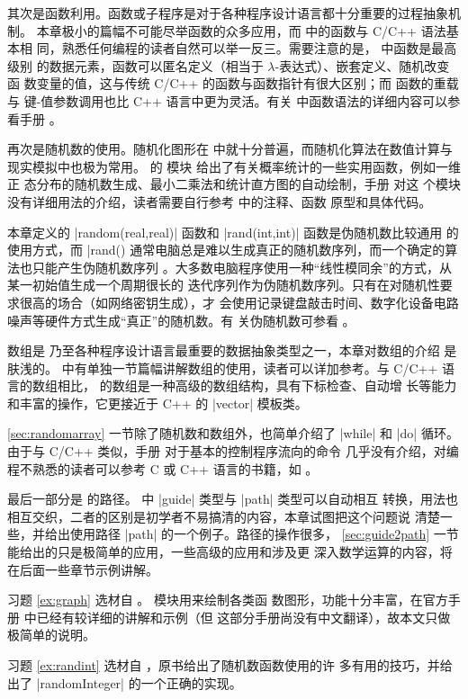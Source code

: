 其次是函数利用。函数或子程序是对于各种程序设计语言都十分重要的过程抽象机制。
本章极小的篇幅不可能尽举函数的众多应用，而 \Asy{} 中的函数与 C/C++ 语法基本相
同，熟悉任何编程的读者自然可以举一反三。需要注意的是，\Asy{} 中函数是最高级别
的数据元素，函数可以匿名定义（相当于 $\lambda$-表达式）、嵌套定义、随机改变函
数变量的值，这与传统 C/C++ 的函数与函数指针有很大区别；而 \Asy{} 函数的重载与
键-值参数调用也比 C++ 语言中更为灵活。有关 \Asy{} 中函数语法的详细内容可以参
看手册 \cite{asyman}。

再次是随机数的使用。随机化图形在 \MP{} 中就十分普遍，而随机化算法在数值计算与
现实模拟中也极为常用。\Asy{} 的  模块
 给出了有关概率统计的一些实用函数，例如一维正
态分布的随机数生成、最小二乘法和统计直方图的自动绘制，手册 \cite{asyman} 对这
个模块没有详细用法的介绍，读者需要自行参考  中的注释、函数
原型和具体代码。

本章定义的 |random(real,real)| 函数和 |rand(int,int)| 函数是伪随机数比较通用
的使用方式，而 |rand() %
通常电脑总是难以生成真正的随机数序列，而一个确定的算法也只能产生伪随机数序列
。大多数电脑程序使用一种“线性模同余”的方式，从某一初始值生成一个周期很长的
迭代序列作为伪随机数序列。只有在对随机性要求很高的场合（如网络密钥生成），才
会使用记录键盘敲击时间、数字化设备电路噪声等硬件方式生成“真正”的随机数。有
关伪随机数可参看 \cite{taocp2}。

数组是 \Asy{} 乃至各种程序设计语言最重要的数据抽象类型之一，本章对数组的介绍
是肤浅的。\cite{asyman} 中有单独一节篇幅讲解数组的使用，读者可以详加参考。与
C/C++ 语言的数组相比，\Asy{} 的数组是一种高级的数组结构，具有下标检查、自动增
长等能力和丰富的操作，它更接近于 C++ 的 |vector| 模板类。

\autoref{sec:randomarray} 一节除了随机数和数组外，也简单介绍了 |while| 和
|do| 循环。由于与 C/C++ 类似，手册 \cite{asyman} 对于基本的控制程序流向的命令
几乎没有介绍，对编程不熟悉的读者可以参考 C 或 C++ 语言的书籍，如 \cite{kandr}
。

最后一部分是 \Asy{} 的路径。\Asy{} 中 |guide| 类型与 |path| 类型可以自动相互
转换，用法也相互交织，二者的区别是初学者不易搞清的内容，本章试图把这个问题说
清楚一些，并给出使用路径 |path| 的一个例子。路径的操作很多，
\autoref{sec:guide2path} 一节能给出的只是极简单的应用，一些高级的应用和涉及更
深入数学运算的内容，将在后面一些章节示例讲解。

习题 \ref{ex:graph} 选材自 \cite{pgfman}。 模块用来绘制各类函
数图形，功能十分丰富，在官方手册 \cite{asyman} 中已经有较详细的讲解和示例（但
这部分手册尚没有中文翻译），故本文只做极简单的说明。

习题 \ref{ex:randint} 选材自 \cite{roberts1995}，原书给出了随机数函数使用的许
多有用的技巧，并给出了 |randomInteger| 的一个正确的实现。

\endinput


